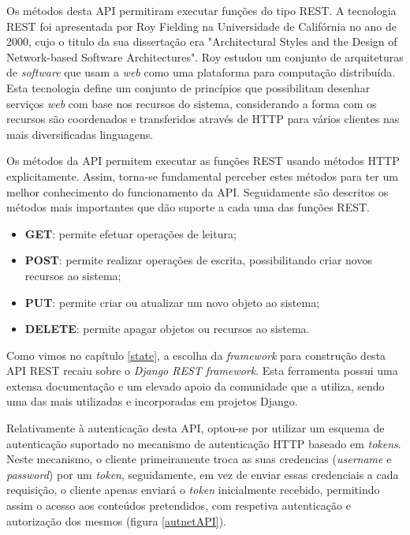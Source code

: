 Os métodos desta \ac{API} permitiram executar funções do tipo \ac{REST}. A tecnologia \ac{REST} foi apresentada por Roy Fielding na Universidade de Califórnia no ano de 2000, cujo o titulo da sua dissertação era "Architectural Styles and the Design of Network-based Software Architectures". Roy estudou um conjunto de arquiteturas de \textit{software} que usam a \textit{web} como uma plataforma para computação distribuída\cite{restpaper}. Esta tecnologia define um conjunto de princípios que possibilitam desenhar serviços \textit{web} com base nos recursos do sistema, considerando a forma com os recursos são coordenados e transferidos através de \ac{HTTP} para vários clientes nas mais diversificadas linguagens. 

Os métodos da API permitem executar as funções \ac{REST} usando métodos \ac{HTTP} explicitamente. Assim, torna-se fundamental perceber estes métodos para ter um melhor conhecimento do funcionamento da \ac{API}. Seguidamente são descritos os métodos mais importantes que dão suporte a cada uma das funções \ac{REST}.


\begin{itemize}
	\item \textbf{GET}: permite efetuar operações de leitura;
	\item \textbf{POST}: permite realizar operações de escrita, possibilitando criar novos recursos ao sistema;
	\item \textbf{PUT}: permite criar ou atualizar um novo objeto ao sistema;  
	\item \textbf{DELETE}: permite apagar objetos ou recursos ao sistema. 
\end{itemize}




Como vimos no capítulo \ref{state}, a escolha da \textit{framework} para construção desta \ac{API} \ac{REST} recaiu sobre o \textit{Django REST framework}. Esta ferramenta possui uma extensa documentação e um elevado apoio da comunidade que a utiliza, sendo uma das mais utilizadas e incorporadas em projetos Django. 

Relativamente à autenticação desta \ac{API}, optou-se por utilizar um esquema de autenticação suportado no mecanismo de autenticação \ac{HTTP} baseado em \textit{tokens}\cite{tokenREST}. Neste mecanismo, o cliente primeiramente troca as suas credencias (\textit{username} e \textit{password}) por um \textit{token}, seguidamente, em vez de enviar essas credenciais a cada requisição, o cliente apenas enviará o \textit{token} inicialmente recebido, permitindo assim o acesso aos conteúdos pretendidos, com respetiva autenticação e autorização dos mesmos (figura \ref{autnetAPI}).


